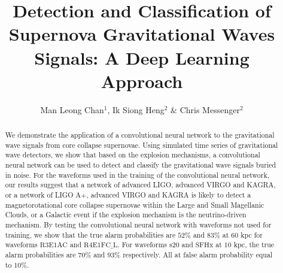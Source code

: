 \documentclass[aps,twocolumn,showpacs,groupedaddress, nofootinbib]{revtex4}  %
\newcommand{\dcc}{LIGO-P1700428}
\begin{document}
\widetext


\title{Detection and Classification of Supernova Gravitational Waves Signals: A Deep Learning Approach}
 
 
\author{Man Leong Chan$^{1}$, Ik Siong Heng$^{2}$ \& Chris Messenger$^{2}$ }

\begin{abstract}
We demonstrate the application of a convolutional neural network to the
gravitational wave signals from core collapse supernovae. Using simulated time
series of gravitational wave detectors, we show that based on the explosion
mechanisms, a convolutional neural network can be used to detect and classify
the gravitational wave signals buried in noise. For the waveforms used in the
training of the convolutional neural network, our results suggest that a
network of advanced LIGO, advanced VIRGO and KAGRA, or a network of LIGO A+,
advanced VIRGO and KAGRA is likely to detect a magnetorotational core collapse
supernovae within the Large and Small Magellanic Clouds, or a Galactic event if
the explosion mechanism is the neutrino-driven mechanism.  By testing the
convolutional neural network with waveforms not used for training, we show that
the true alarm probabilities are $52\%$ and $83\%$ at $60$ kpc for waveforms
$\text{R3E1AC}$ and $\text{R4E1FC\_L}$.  For waveforms $\text{s}20$ and
$\text{SFHx}$ at $10$ kpc, the true alarm probabilities are $70\%$ and $93\%$
respectively. All at false alarm probability equal to $10\%$. 
\end{abstract}
\end{document}
